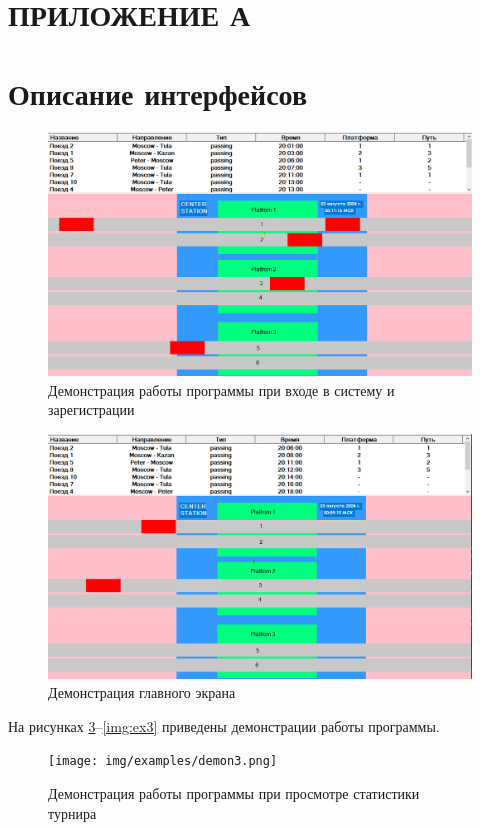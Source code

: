 \section*{\centering ПРИЛОЖЕНИЕ А}

\section*{Описание интерфейсов}

\begin{figure}[h]
	\centering
	\includegraphics[height=0.25\textheight]{img/examples/demon1.png}
	\caption{Демонстрация работы программы при входе в систему и зарегистрации}
	\label{img:ex1}
\end{figure}

\begin{figure}[h]
	\centering
	\includegraphics[height=0.3\textheight]{img/examples/demon2.png}
	\caption{Демонстрация главного экрана}
	\label{img:ex2}
\end{figure}
\clearpage
На рисунках \ref{img:ex4}--\ref{img:ex3} приведены демонстрации работы программы.
\begin{figure}[h]
	\centering
	\texttt{[image: img/examples/demon3.png]}
	\caption{Демонстрация работы программы при просмотре статистики турнира}
	\label{img:ex4}
\end{figure}

